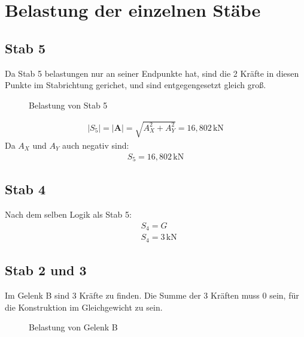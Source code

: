 \section{Belastung der einzelnen Stäbe}
\subsection{Stab 5}
Da Stab 5 belastungen nur an seiner Endpunkte hat, sind die 2 Kräfte in diesen Punkte im Stabrichtung gerichet, und sind entgegengesetzt gleich groß.
\begin{figure}[H]
  \centering
  \caption{Belastung von Stab 5}
\end{figure}
\begin{align*}
  |S_5| = |\mathbf{A}| = \sqrt{A_X^2 + A_Y^2} = 16,802 \, \text{kN}
\end{align*}
Da $A_X$ und $A_Y$ auch negativ sind:
\begin{align*}
  \boxed{
    S_5 = 16,802 \, \text{kN}
  }
\end{align*}

\subsection{Stab 4}
Nach dem selben Logik als Stab 5:
\begin{align*}
  &S_4 = G \\
  &\boxed{
    S_4 = 3 \, \text{kN}
  }
\end{align*}

\subsection{Stab 2 und 3}
Im Gelenk B sind 3 Kräfte zu finden. Die Summe der 3 Kräften muss 0 sein, für die Konstruktion im Gleichgewicht zu sein.
\begin{figure}[H]
  \centering
  \caption{Belastung von Gelenk B}
\end{figure}

